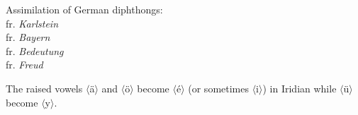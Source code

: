 \ex
Assimilation of German diphthongs:\\
 fr. \emph{Karlstein}\\
 fr. \emph{Bayern}\\
 fr. \emph{Bedeutung}\\
 fr. \emph{Freud}
\xe

The raised vowels $\langle$\"a$\rangle$ and $\langle$\"o$\rangle$ become  $\langle$é$\rangle$ (or sometimes  $\langle$i$\rangle$) in Iridian while $\langle$\"u$\rangle$ become  $\langle$y$\rangle$.
